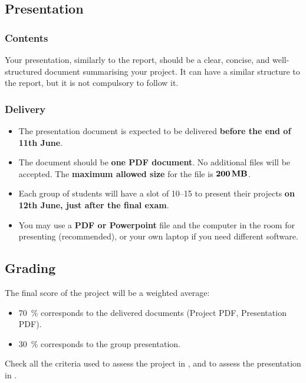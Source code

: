 \documentclass[11pt]{exam}
\begin{document}
    \subsection{Presentation}
    \label{subsec:presentation}
    \subsubsection{Contents}
    Your presentation, similarly to the report, should be a clear, concise, and well-structured document summarising your project. It can have a similar structure to the report, but it is not compulsory to follow it. %

    \subsubsection{Delivery}
    \begin{itemize}
        \item The presentation document is expected to be delivered \href{https://atenea.upc.edu/mod/assign/view.php?id=4973442}{} \textbf{before the end of 11th June}.
        \item The document should be \textbf{one PDF document}. No additional files will be accepted. The \textbf{maximum allowed size} for the file is $\SI{\mathbf{200}}{\mathbf{\mega\byte}}$. %
        \item Each group of students will have a slot of \SIrange{10}{15}{\min} to present their projects \textbf{on 12th June, just after the final exam}.
        \item You may use a \textbf{PDF or Powerpoint} file and the computer in the room for presenting (recommended), or your own laptop if you need different software. %
    \end{itemize}

    \subsection{Grading}
    The final score of the project will be a weighted average:
    \begin{itemize}
        \item \SI{70}{\percent} corresponds to the delivered documents (Project PDF, Presentation PDF).
        \item \SI{30}{\percent} corresponds to the group presentation.
    \end{itemize}
    Check all the criteria used to assess the project in , and to assess the presentation in .
\end{document}
